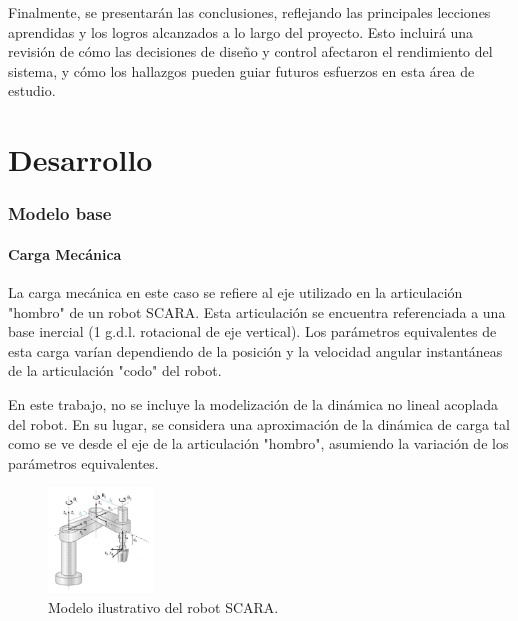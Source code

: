 \documentclass{article}
\begin{document}
Finalmente, se presentarán las conclusiones, reflejando las principales lecciones aprendidas y los logros alcanzados a lo 
largo del proyecto. Esto incluirá una revisión de cómo las decisiones de diseño y control afectaron el rendimiento del 
sistema, y cómo los hallazgos pueden guiar futuros esfuerzos en esta área de estudio.

\newpage

\part*{Desarrollo}


\section{Modelo base}

\subsection{Carga Mecánica}
    
    La carga mecánica en este caso se refiere al eje utilizado en la articulación "hombro" 
    de un robot SCARA. Esta articulación se encuentra referenciada a una base inercial (1 g.d.l.
    rotacional de eje vertical). Los parámetros equivalentes de esta carga varían dependiendo de la posición 
    y la velocidad angular instantáneas de la articulación "codo" del robot.

    En este trabajo, no se incluye la modelización de la dinámica no lineal acoplada del robot. En su lugar, 
    se considera una aproximación de la dinámica de carga tal como se ve desde el eje de la articulación 
    "hombro", asumiendo la variación de los parámetros equivalentes.

    \begin{figure}[H]
        \centering
        \includegraphics[width=0.25\textwidth]{Alan1.jpg}
        \caption{Modelo ilustrativo del robot SCARA.}
    \end{figure}
\end{document}
